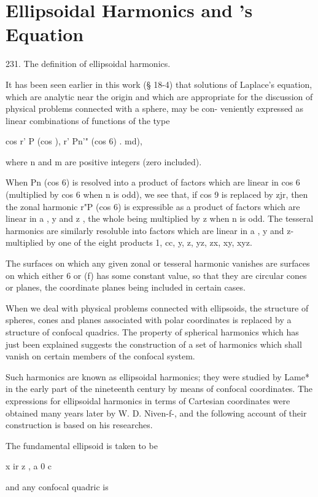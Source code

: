 \chapter{Ellipsoidal Harmonics and \Lame's Equation}

231. The definition of ellipsoidal harmonics.

It has been seen earlier in this work (§ 18-4) that solutions of
Laplace's equation, which are analytic near the origin and which are
appropriate for the discussion of physical problems connected with a
sphere, may be con- veniently expressed as linear combinations of
functions of the type

cos r' P (cos ), r' Pn'" (cos 6) . md),

where n and m are positive integers (zero included).

When Pn (cos 6) is resolved into a product of factors which are linear
in cos 6 (multiplied by cos 6 when n is odd), we see that, if cos 9 is
replaced by zjr, then the zonal harmonic r"P (cos 6) is expressible as
a product of factors which are linear in a , y and z , the whole being
multiplied by z when n is odd. The tesseral harmonics are similarly
resoluble into factors which are linear in a , y and z- multiplied by
one of the eight products 1, cc, y, z, yz, zx, xy, xyz.

The surfaces on which any given zonal or tesseral harmonic vanishes
are surfaces on which either 6 or (f) has some constant value, so that
they are circular cones or planes, the coordinate planes being
included in certain cases.

When we deal with physical problems connected with ellipsoids, the
structure of spheres, cones and planes associated with polar
coordinates is replaced by a structure of confocal quadrics. The
property of spherical harmonics which has just been explained suggests
the construction of a set of harmonics which shall vanish on certain
members of the confocal system.

Such harmonics are known as ellipsoidal harmonics; they were studied
by Lame* in the early part of the nineteenth century by means of
confocal coordinates. The expressions for ellipsoidal harmonics in
terms of Cartesian coordinates were obtained many years later by W. D.
Niven-f-, and the following account of their construction is based on
his researches.

The fundamental ellipsoid is taken to be

x ir z , a 0 c

and any confocal quadric is

